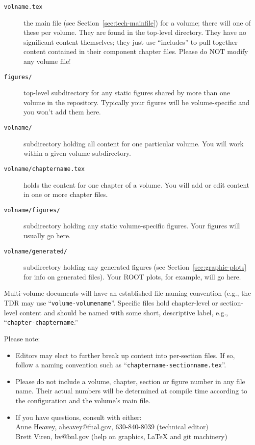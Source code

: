 \begin{description}
\item[\texttt{volname.tex}] the main file (see Section~\ref{sec:tech-mainfile}) for a volume; there will one of these per volume. They are found in the top-level
  directory. They have no significant content themselves; they just use
  ``includes'' to pull together content contained in their component chapter files. Please do NOT modify any volume file!
\item[\texttt{figures/}] top-level subdirectory for any static figures
  shared by more than one volume in the repository. Typically your figures will be volume-specific and you won't add them here.
\item[\texttt{volname/}] subdirectory holding all content for one particular volume. You will work within a given volume subdirectory.
\item[\texttt{volname/chaptername.tex}] holds the content for one chapter of a volume. You will add or edit content in one or more chapter files.
\item[\texttt{volname/figures/}] subdirectory holding any static volume-specific figures. Your figures will usually go here.
\item[\texttt{volname/generated/}] subdirectory holding any generated
  figures (see Section~\ref{sec:graphic-plots} for info on generated files). Your ROOT plots, for example, will go here.
\end{description}

Multi-volume documents will have an established file naming convention (e.g., the
TDR may use ``\texttt{volume-volumename}''.
Specific files hold chapter-level or section-level content and should be named with some
short, descriptive label, e.g., ``\texttt{chapter-chaptername}.''

Please note:
\begin{itemize}
\item Editors may elect to further break up content into per-section files. If so, follow a naming convention such as ``\texttt{chaptername-sectionname.tex}''.
\item Please do not include a volume, chapter, section or figure number in any file name. Their actual numbers will be determined at compile time according to the configuration and the volume's main file. 
\item If you have questions, consult with either: \\
  Anne Heavey, aheavey@fnal.gov, 630-840-8039 (technical editor)\\
  Brett Viren, bv@bnl.gov (help on graphics, \LaTeX{} and git machinery)
\end{itemize}

